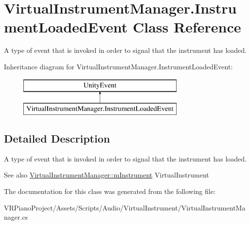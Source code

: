 \hypertarget{class_virtual_instrument_manager_1_1_instrument_loaded_event}{}\section{Virtual\+Instrument\+Manager.\+Instrument\+Loaded\+Event Class Reference}
\label{class_virtual_instrument_manager_1_1_instrument_loaded_event}


A type of event that is invoked in order to signal that the instrument has loaded.  


Inheritance diagram for Virtual\+Instrument\+Manager.\+Instrument\+Loaded\+Event\+:\begin{figure}[H]
\begin{center}
\leavevmode
\includegraphics[height=2.000000cm]{class_virtual_instrument_manager_1_1_instrument_loaded_event}
\end{center}
\end{figure}


\subsection{Detailed Description}
A type of event that is invoked in order to signal that the instrument has loaded. 

\begin{DoxySeeAlso}{See also}
\hyperlink{class_virtual_instrument_manager_aed435d1f9be09864846db4322dc21fd1}{Virtual\+Instrument\+Manager\+::m\+Instrument} Virtual\+Instrument 
\end{DoxySeeAlso}


The documentation for this class was generated from the following file\+:\begin{DoxyCompactItemize}
\item 
V\+R\+Piano\+Project/\+Assets/\+Scripts/\+Audio/\+Virtual\+Instrument/Virtual\+Instrument\+Manager.\+cs\end{DoxyCompactItemize}
